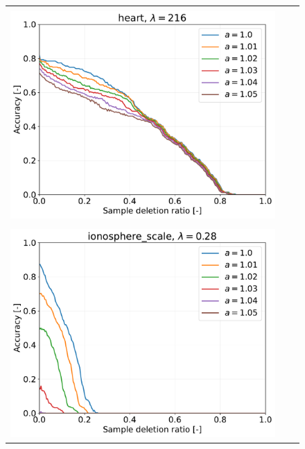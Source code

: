 \begin{figure}[H]
\begin{tabular}{ccc}
		\begin{minipage}[b]{0.3\hsize}\centering {\small Dataset: heart, $\lambda=n$}\\\includegraphics[width=0.8\hsize]{fig/table_logistic/heart-logistic/kernel/kernel_ss_screening_rate_lam216_x_n_y_etest.pdf}\end{minipage}
		\\
		\begin{minipage}[b]{0.3\hsize}\centering {\small Dataset: ionosphere, $\lambda=n \cdot 10^{-3}$}\\\includegraphics[width=0.8\hsize]{fig/table_logistic/ionosphere_scale-logistic/kernel/kernel_ss_screening_rate_lam0.28_x_n_y_etest.pdf}\end{minipage}
		&

\end{tabular}
\end{figure}
